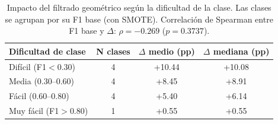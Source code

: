\begin{table}[htbp]
\centering
\small
\caption{Impacto del filtrado geométrico según la dificultad de la clase. Las clases se agrupan por su F1 base (con SMOTE). Correlación de Spearman entre F1 base y $\Delta$: $\rho = -0.269$ ($p = 0.3737$).}
\label{tab:rare_class_benefit}
\begin{tabular}{lccc}
\toprule
\textbf{Dificultad de clase} & \textbf{N clases} & \textbf{$\Delta$ medio (pp)} & \textbf{$\Delta$ mediana (pp)} \\
\midrule
Difícil (F1$<$0.30) & 4 & +10.44 & +10.08 \\
Media (0.30--0.60) & 4 & +8.45 & +8.91 \\
Fácil (0.60--0.80) & 4 & +5.40 & +6.14 \\
Muy fácil (F1$>$0.80) & 1 & +0.55 & +0.55 \\
\bottomrule
\end{tabular}
\end{table}